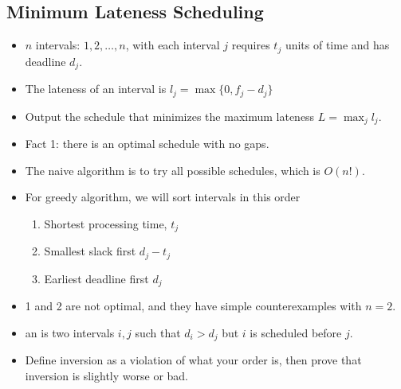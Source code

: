 \documentclass[a4paper,12pt]{article}
\begin{document}
\subsection{Minimum Lateness Scheduling}
\begin{itemize}
    \item $n$ intervals: $1,2,\dots,n$, with each interval $j$ requires $t_j$ units of time and has deadline $d_j$.
    \item The lateness of an interval is $l_j=\max\{0,f_j-d_j\}$
    \item Output the schedule that minimizes the maximum lateness $L=\max_jl_j$.
    \item Fact 1: there is an optimal schedule with no gaps.
    \item The naive algorithm is to try all possible schedules, which is $O(n!)$.
    \item For greedy algorithm, we will sort intervals in this order
    \begin{enumerate}
        \item Shortest processing time, $t_j$
        \item Smallest slack first $d_j-t_j$
        \item Earliest deadline first $d_j$
    \end{enumerate}
    \item 1 and 2 are not optimal, and they have simple counterexamples with $n=2$.
    \item an  is two intervals $i,j$ such that $d_i>d_j$ but $i$ is scheduled before $j$.
    \item {} Define inversion as a violation of what your order is, then prove that inversion is slightly worse or bad.
\end{itemize}
\end{document}
